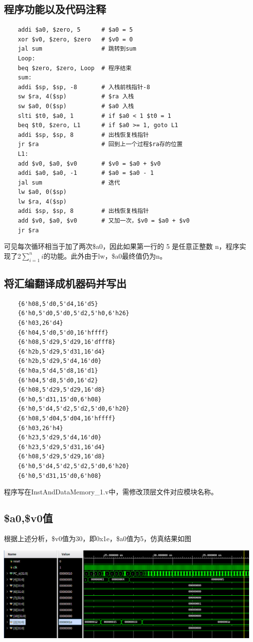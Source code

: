 \documentclass{article}
\begin{document}
\subsection{程序功能以及代码注释}
\begin{lstlisting}
    addi $a0, $zero, 5      # $a0 = 5
    xor $v0, $zero, $zero   # $v0 = 0
    jal sum                 # 跳转到sum
    Loop:
    beq $zero, $zero, Loop  # 程序结束
    sum:
    addi $sp, $sp, -8       # 入栈前栈指针-8
    sw $ra, 4($sp)          # $ra 入栈
    sw $a0, 0($sp)          # $a0 入栈
    slti $t0, $a0, 1        # if $a0 < 1 $t0 = 1
    beq $t0, $zero, L1      # if $a0 >= 1, goto L1
    addi $sp, $sp, 8        # 出栈恢复栈指针
    jr $ra                  # 回到上一个过程$ra存的位置
    L1:
    add $v0, $a0, $v0       # $v0 = $a0 + $v0
    addi $a0, $a0, -1       # $a0 = $a0 - 1
    jal sum                 # 迭代
    lw $a0, 0($sp)          
    lw $ra, 4($sp)
    addi $sp, $sp, 8        # 出栈恢复栈指针
    add $v0, $a0, $v0       # 又加一次，$v0 = $a0 + $v0
    jr $ra
\end{lstlisting}
可见每次循环相当于加了两次\$a0，因此如果第一行的 5 是任意正整数 n，程序实现了2$\sum_{i=1}^ni$的功能。此外由于lw，\$a0最终值仍为n。
\subsection{将汇编翻译成机器码并写出}
\begin{lstlisting}
    {6'h08,5'd0,5'd4,16'd5}
    {6'h0,5'd0,5'd0,5'd2,5'h0,6'h26}
    {6'h03,26'd4}
    {6'h04,5'd0,5'd0,16'hffff}
    {6'h08,5'd29,5'd29,16'dfff8}
    {6'h2b,5'd29,5'd31,16'd4}
    {6'h2b,5'd29,5'd4,16'd0}
    {6'h0a,5'd4,5'd8,16'd1}
    {6'h04,5'd8,5'd0,16'd2}
    {6'h08,5'd29,5'd29,16'd8}
    {6'h0,5'd31,15'd0,6'h08}
    {6'h0,5'd4,5'd2,5'd2,5'd0,6'h20}
    {6'h08,5'd04,5'd04,16'hffff}
    {6'h03,26'h4}
    {6'h23,5'd29,5'd4,16'd0}
    {6'h23,5'd29,5'd31,16'd4}
    {6'h08,5'd29,5'd29,16'd8}
    {6'h0,5'd4,5'd2,5'd2,5'd0,6'h20}
    {6'h0,5'd31,15'd0,6'h08}
\end{lstlisting}
程序写在InstAndDataMemory\_1.v中，需修改顶层文件对应模块名称。
\subsection{\$a0,\$v0值}
根据上述分析，\$v0值为30，即0x1e，\$a0值为5，仿真结果如图
\begin{center}
    \includegraphics[width = 16cm]{images/sim_2_waveform.png}
\end{center}
\end{document}
